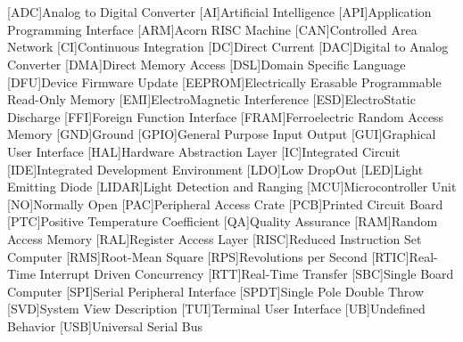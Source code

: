 \cleardoublepage
\chapter*{\listofabbrevname}
{}

\begin{acronym}[KolikMista]

	[ADC]{Analog to Digital Converter}
	[AI]{Artificial Intelligence}
	[API]{Application Programming Interface}
	[ARM]{Acorn RISC Machine}
	[CAN]{Controlled Area Network}
	[CI]{Continuous Integration}
	[DC]{Direct Current}
	[DAC]{Digital to Analog Converter}
	[DMA]{Direct Memory Access}
	[DSL]{Domain Specific Language}
	[DFU]{Device Firmware Update}
	[EEPROM]{Electrically Erasable Programmable Read-Only Memory}
	[EMI]{ElectroMagnetic Interference}
	[ESD]{ElectroStatic Discharge}
	[FFI]{Foreign Function Interface}
	[FRAM]{Ferroelectric Random Access Memory}
	[GND]{Ground}
	[GPIO]{General Purpose Input Output}
	[GUI]{Graphical User Interface}
	[HAL]{Hardware Abstraction Layer}
	[IC]{Integrated Circuit}
	[IDE]{Integrated Development Environment}
	[LDO]{Low DropOut}
	[LED]{Light Emitting Diode}
	[LIDAR]{Light Detection and Ranging}
	[MCU]{Microcontroller Unit}
	[NO]{Normally Open}
	[PAC]{Peripheral Access Crate}
	[PCB]{Printed Circuit Board}
	[PTC]{Positive Temperature Coefficient}
	[QA]{Quality Assurance}
	[RAM]{Random Access Memory}
	[RAL]{Register Access Layer}
	[RISC]{Reduced Instruction Set Computer}
	[RMS]{Root-Mean Square}
	[RPS]{Revolutions per Second}
	[RTIC]{Real-Time Interrupt Driven Concurrency}
	[RTT]{Real-Time Transfer}
	[SBC]{Single Board Computer}
	[SPI]{Serial Peripheral Interface}
	[SPDT]{Single Pole Double Throw}
	[SVD]{System View Description}
	[TUI]{Terminal User Interface}
	[UB]{Undefined Behavior}
	[USB]{Universal Serial Bus}


\end{acronym}
